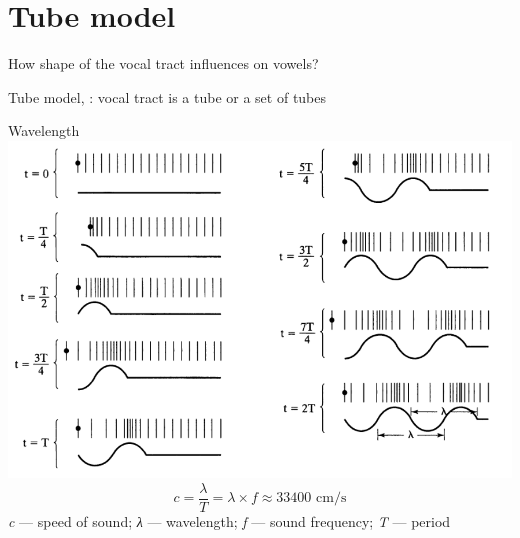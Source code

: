 \section{Tube model}
\begin{frame}{How shape of the vocal tract influences on vowels?}
\Large
\vfill
\begin{center}
\begin{vowel}
\end{vowel}
\end{center}
\vfill
\normalsize
Tube model, \citep{fant60}: vocal tract is a tube or a set of tubes
\end{frame}

\begin{frame}{Wavelength}
\includegraphics[width=0.8\linewidth]{11-wavelength.png}
$$c = \frac{\lambda}{T} = \lambda\times f \approx 33400\text{ cm/s}$$
\textit{c} --- speed of sound; \textit{λ} --- wavelength; \textit{f} --- sound frequency; \textit{T} --- period
\end{frame}

